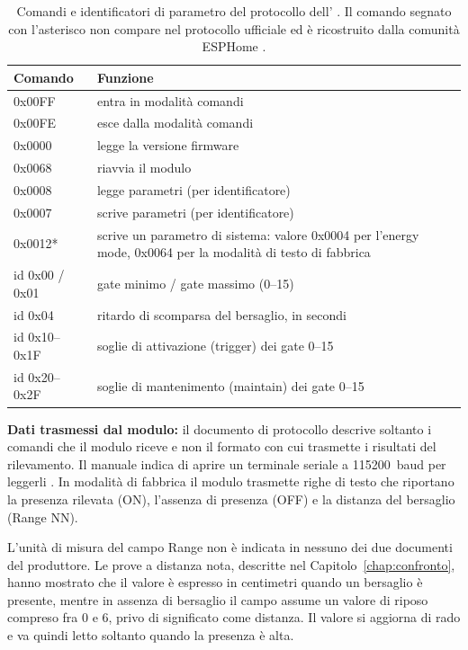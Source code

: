 \begin{table}[!htb]
\centering
\caption{Comandi e identificatori di parametro del protocollo dell'\ldc{} \cite{hilinkProtoLD2420}. Il comando segnato con l'asterisco non compare nel protocollo ufficiale ed è ricostruito dalla comunità ESPHome \cite{esphomeLD2420src}.}
\label{tab:c3-9}
\small
\begin{tabularx}{\linewidth}{@{}lX@{}}
\toprule
\textbf{Comando} & \textbf{Funzione} \\
\midrule
0x00FF & entra in modalità comandi \\
0x00FE & esce dalla modalità comandi \\
0x0000 & legge la versione firmware \\
0x0068 & riavvia il modulo \\
0x0008 & legge parametri (per identificatore) \\
0x0007 & scrive parametri (per identificatore) \\
0x0012* & scrive un parametro di sistema: valore 0x0004 per l'energy mode, 0x0064 per la modalità di testo di fabbrica \\
id 0x00 / 0x01 & gate minimo / gate massimo (0–15) \\
id 0x04 & ritardo di scomparsa del bersaglio, in secondi \\
id 0x10–0x1F & soglie di attivazione (trigger) dei gate 0–15 \\
id 0x20–0x2F & soglie di mantenimento (maintain) dei gate 0–15 \\
\bottomrule
\end{tabularx}
\end{table}

\textbf{Dati trasmessi dal modulo:} il documento di protocollo descrive soltanto i comandi che il modulo riceve e non il formato con cui trasmette i risultati del rilevamento. Il manuale indica di aprire un terminale seriale a 115200~baud per leggerli \cite[§4.1]{hilinkManualLD2420}. In modalità di fabbrica il modulo trasmette righe di testo che riportano la presenza rilevata (ON), l'assenza di presenza (OFF) e la distanza del bersaglio (Range NN).

L'unità di misura del campo Range non è indicata in nessuno dei due documenti del produttore. Le prove a distanza nota, descritte nel Capitolo~\ref{chap:confronto}, hanno mostrato che il valore è espresso in centimetri quando un bersaglio è presente, mentre in assenza di bersaglio il campo assume un valore di riposo compreso fra 0 e 6, privo di significato come distanza. Il valore si aggiorna di rado e va quindi letto soltanto quando la presenza è alta.

